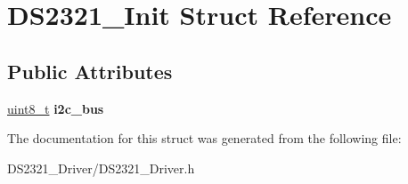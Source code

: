 \hypertarget{structDS2321__Init}{}\section{D\+S2321\+\_\+\+Init Struct Reference}
\label{structDS2321__Init}
\subsection*{Public Attributes}
\begin{DoxyCompactItemize}
\item 
\mbox{\label{structDS2321__Init_ad1081923eb82a56140235ba76d92e6a8}} 
\hyperlink{vl53l0x__types_8h_aba7bc1797add20fe3efdf37ced1182c5}{uint8\+\_\+t} {\bfseries i2c\+\_\+bus}
\end{DoxyCompactItemize}


The documentation for this struct was generated from the following file\+:\begin{DoxyCompactItemize}
\item 
D\+S2321\+\_\+\+Driver/D\+S2321\+\_\+\+Driver.\+h\end{DoxyCompactItemize}
